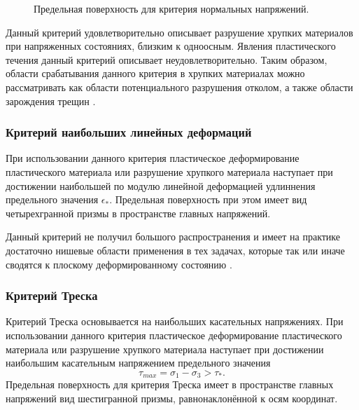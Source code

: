 \begin{figure}[h]
\caption{Предельная поверхность для критерия нормальных напряжений.}
\end{figure}

Данный критерий удовлетворительно описывает разрушение хрупких материалов при напряженных состояниях, близким к одноосным. Явления пластического течения данный критерий описывает неудовлетворительно. Таким образом, области срабатывания данного критерия в хрупких материалах можно рассматривать как области потенциального разрушения отколом, а также области зарождения трещин \cite{griffith, orowan}.


\subsubsection{Критерий наибольших линейных деформаций}

При использовании данного критерия пластическое деформирование пластического материала или разрушение хрупкого материала наступает при достижении наибольшей по модулю линейной деформацией удлиннения предельного значения $\epsilon_*$. Предельная поверхность при этом имеет вид четырехгранной призмы в пространстве главных напряжений.

Данный критерий не получил большого распространения и имеет на практике достаточно нишевые области применения в тех задачах, которые так или иначе сводятся к плоскому деформированному состоянию \cite{selivanov}.


\subsubsection{Критерий Треска}

Критерий Треска основывается на наибольших касательных напряжениях. При использовании данного критерия пластическое деформирование пластического материала или разрушение хрупкого материала наступает при достижении наибольшим касательным напряжением предельного значения
\begin{equation}
\tau_{max} = \sigma_1 - \sigma_3 > \tau_*.
\end{equation}
Предельная поверхность для критерия Треска имеет в пространстве главных напряжений вид шестигранной призмы, равнонаклонённой к осям координат.

